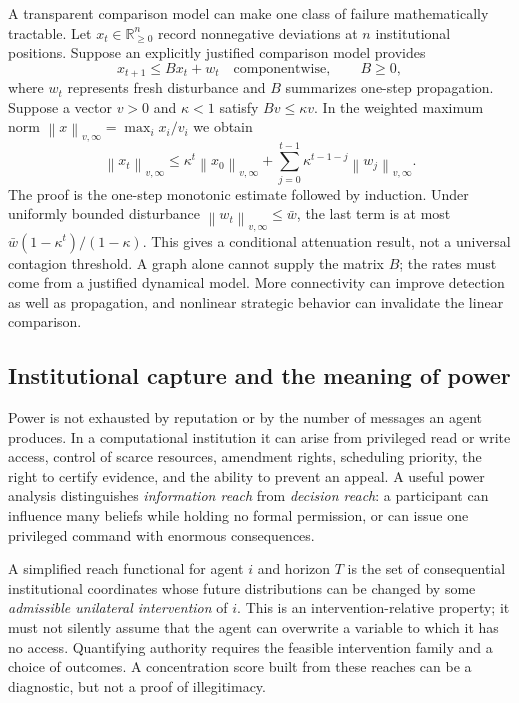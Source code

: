 \documentclass[11pt,letterpaper]{article}
\theoremstyle{plain}
\theoremstyle{definition}
\theoremstyle{remark}
\newcommand{\norm}[1]{\left\lVert#1\right\rVert}
\begin{document}
A transparent comparison model can make one class of failure mathematically tractable. Let $x_t\in\mathbb R_{\ge0}^n$ record nonnegative deviations at $n$ institutional positions. Suppose an explicitly justified comparison model provides
\begin{equation}\label{eq:propagation}
x_{t+1}\le Bx_t+w_t
\quad\text{componentwise},\qquad B\ge0,
\end{equation}
where $w_t$ represents fresh disturbance and $B$ summarizes one-step propagation. Suppose a vector $v>0$ and $\kappa<1$ satisfy $Bv\le\kappa v$. In the weighted maximum norm $\norm{x}_{v,\infty}=\max_i x_i/v_i$ we obtain
\begin{equation}\label{eq:propagation-bound}
\norm{x_t}_{v,\infty}\le
\kappa^t\norm{x_0}_{v,\infty}
+\sum_{j=0}^{t-1}\kappa^{t-1-j}\norm{w_j}_{v,\infty}.
\end{equation}
The proof is the one-step monotonic estimate followed by induction. Under uniformly bounded disturbance $\norm{w_t}_{v,\infty}\le\bar w$, the last term is at most $\bar w(1-\kappa^t)/(1-\kappa)$. This gives a conditional attenuation result, not a universal contagion threshold. A graph alone cannot supply the matrix $B$; the rates must come from a justified dynamical model. More connectivity can improve detection as well as propagation, and nonlinear strategic behavior can invalidate the linear comparison.

\subsection{Institutional capture and the meaning of power}

Power is not exhausted by reputation or by the number of messages an agent produces. In a computational institution it can arise from privileged read or write access, control of scarce resources, amendment rights, scheduling priority, the right to certify evidence, and the ability to prevent an appeal. A useful power analysis distinguishes \emph{information reach} from \emph{decision reach}: a participant can influence many beliefs while holding no formal permission, or can issue one privileged command with enormous consequences.

A simplified reach functional for agent $i$ and horizon $T$ is the set of consequential institutional coordinates whose future distributions can be changed by some \emph{admissible unilateral intervention} of $i$. This is an intervention-relative property; it must not silently assume that the agent can overwrite a variable to which it has no access. Quantifying authority requires the feasible intervention family and a choice of outcomes. A concentration score built from these reaches can be a diagnostic, but not a proof of illegitimacy.
\end{document}
